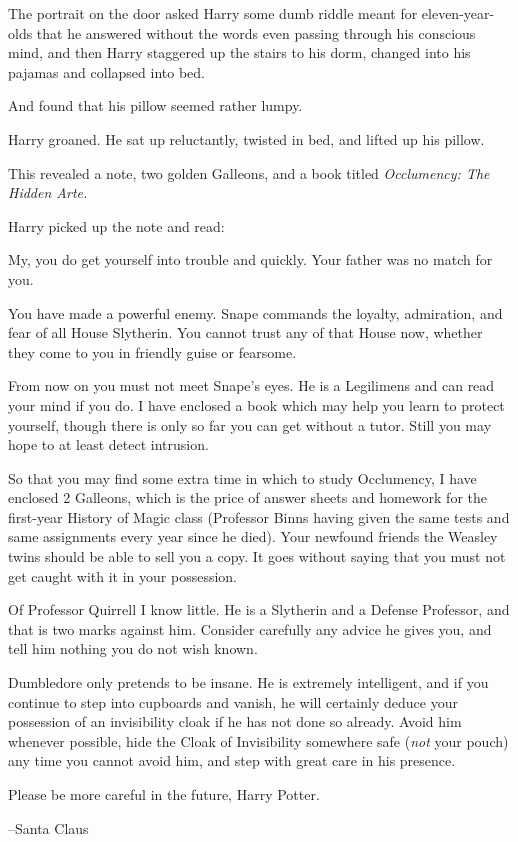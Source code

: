 The portrait on the door asked Harry some dumb riddle meant for eleven-year-olds that he answered without the words even passing through his conscious mind, and then Harry staggered up the stairs to his dorm, changed into his pajamas and collapsed into bed.

And found that his pillow seemed rather lumpy.

Harry groaned. He sat up reluctantly, twisted in bed, and lifted up his pillow.

This revealed a note, two golden Galleons, and a book titled \emph{Occlumency: The Hidden Arte.}

Harry picked up the note and read:

\begin{writtenNote}
My, you do get yourself into trouble and quickly. Your father was no match for you.

You have made a powerful enemy. Snape commands the loyalty, admiration, and fear of all House Slytherin. You cannot trust any of that House now, whether they come to you in friendly guise or fearsome.

From now on you must not meet Snape's eyes. He is a Legilimens and can read your mind if you do. I have enclosed a book which may help you learn to protect yourself, though there is only so far you can get without a tutor. Still you may hope to at least detect intrusion.

So that you may find some extra time in which to study Occlumency, I have enclosed 2 Galleons, which is the price of answer sheets and homework for the first-year History of Magic class (Professor Binns having given the same tests and same assignments every year since he died). Your newfound friends the Weasley twins should be able to sell you a copy. It goes without saying that you must not get caught with it in your possession.

Of Professor Quirrell I know little. He is a Slytherin and a Defense Professor, and that is two marks against him. Consider carefully any advice he gives you, and tell him nothing you do not wish known.

Dumbledore only pretends to be insane. He is extremely intelligent, and if you continue to step into cupboards and vanish, he will certainly deduce your possession of an invisibility cloak if he has not done so already. Avoid him whenever possible, hide the Cloak of Invisibility somewhere safe (\emph{not} your pouch) any time you cannot avoid him, and step with great care in his presence.

Please be more careful in the future, Harry Potter.

\---Santa Claus
\end{writtenNote}

